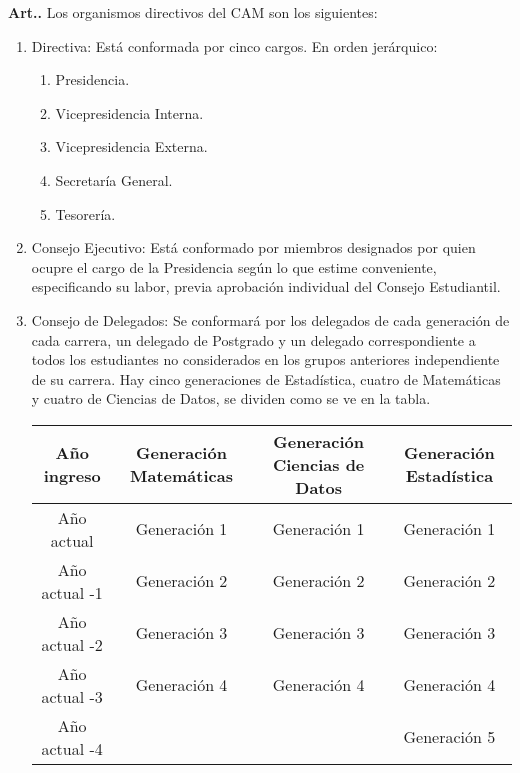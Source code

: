 \documentclass[letterpaper,11pt]{article}
\newcounter{art}
\newenvironment{art}{\refstepcounter{art}\mbox{\textbf{Art.{\space}\theart.}}\ignorespaces}{}
\begin{document}
\begin{art}\label{organismosDirectivos}
    Los organismos directivos del CAM son los siguientes:
    \begin{enumerate}
        \item Directiva: Está conformada por cinco cargos. En orden jerárquico:
              \begin{enumerate}
                  \item Presidencia.
                  \item Vicepresidencia Interna.
                  \item Vicepresidencia Externa.
                  \item Secretaría General.
                  \item Tesorería.
              \end{enumerate}
        \item Consejo Ejecutivo: Está conformado por miembros designados por quien ocupre el cargo de la Presidencia según lo que estime conveniente, especificando su labor, previa aprobación individual del Consejo Estudiantil.
        \item Consejo de Delegados: Se conformará por los delegados de cada generación de cada carrera, un delegado de Postgrado y un delegado correspondiente a todos los estudiantes no considerados en los grupos anteriores independiente de su carrera. Hay cinco generaciones de Estadística, cuatro de Matemáticas y cuatro de Ciencias de Datos, se dividen como se ve en la tabla.
              \begin{figure*}[h]
                  \begin{tabular}{|c|c|c|c|}
                      \hline
                      Año ingreso & Generación Matemáticas & Generación Ciencias de Datos & Generación Estadística\\
                      \hline
                      Año actual  & Generación 1           & Generación 1           & Generación 1\\
                      Año actual -1 & Generación 2           & Generación 2           & Generación 2\\
                      Año actual -2 & Generación 3           & Generación 3           & Generación 3\\
                      Año actual -3 & Generación 4           & Generación 4           & Generación 4\\
                      Año actual -4 & & & Generación 5 \\

\end{tabular}
\end{figure*}
\end{enumerate}
\end{art}
\end{document}
